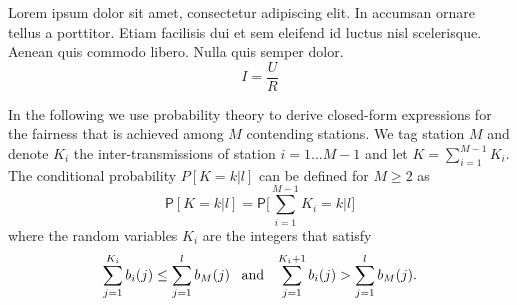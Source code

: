 Lorem ipsum dolor sit amet, consectetur adipiscing elit. In accumsan ornare tellus a porttitor. Etiam facilisis dui et sem eleifend id luctus nisl scelerisque. Aenean quis commodo libero. Nulla quis semper dolor.
%
\begin{equation}
 I = \frac{U}{R} 
\end{equation}

In the following we use probability theory to derive closed-form expressions for the fairness that is achieved among $M$ contending stations. We tag station $M$ and denote $K_i$ the inter-transmissions of station $i = 1 \dots M-1$ and let $K = \sum_{i=1}^{M-1} K_i$. The conditional probability $P[K\!=\!k|l]$ can be defined for $M \ge 2$ as
%
\begin{equation}
\mathsf{P}[K\!=\!k|l] = \mathsf{P} \Biggl[\sum_{i=1}^{M-1} K_i = k \Big| l \Biggr]
\label{eq:chapter03:exactpmf}
\end{equation}
%
where the random variables $K_i$ are the integers that satisfy
%
\begin{equation*}
\sum_{j=1}^{K_i} b_i(j) \le \sum_{j=1}^{l} b_M(j) \;\;\; \textmd{and} \;\;\; \sum_{j=1}^{K_i+1} b_i(j) > \sum_{j=1}^{l} b_M(j) .
\end{equation*}


%
%
